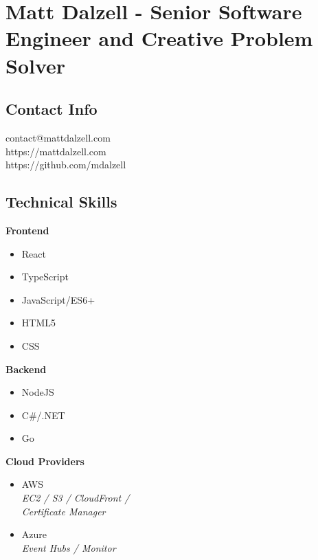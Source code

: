 \documentclass[10pt]{article}
\begin{document}

\section*{Matt Dalzell - {\large Senior Software Engineer and Creative Problem Solver}}

\setlength{\columnsep}{4em}
\setlength{\columnseprule}{0.1pt}
\begin{paracol}{2}

    \subsection*{Contact Info}
    contact@mattdalzell.com \\
    https://mattdalzell.com \\
    https://github.com/mdalzell

    \subsection*{Technical Skills}

    \textbf{Frontend}
    \begin{itemize}
        \item React
        \item TypeScript
        \item JavaScript/ES6+
        \item HTML5
        \item CSS
    \end{itemize}

    \noindent \textbf{Backend}
    \begin{itemize}
        \item NodeJS
        \item C\#/.NET
        \item Go
    \end{itemize}

    \noindent \textbf{Cloud Providers}
    \begin{itemize}
        \item AWS  \\ {\footnotesize{\textit{EC2 / S3 / CloudFront / \\ Certificate Manager}}}
        \item Azure \\ {\footnotesize{\textit{Event Hubs / Monitor}}}
    \end{itemize}


\end{paracol}
\end{document}
